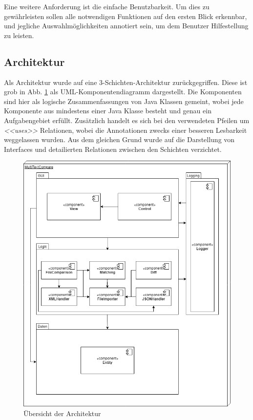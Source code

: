 Eine weitere Anforderung ist die einfache Benutzbarkeit. Um dies zu gewährleisten sollen alle notwendigen Funktionen auf den ersten Blick erkennbar, und jegliche Auswahlmöglichkeiten annotiert sein, um dem Benutzer Hilfestellung zu leisten.

\subsection{Architektur}\label{architektur}

Als Architektur wurde auf eine 3-Schichten-Architektur zurückgegriffen. Diese ist grob in Abb. \ref{fig:architektur} als UML-Komponentendiagramm dargestellt. Die Komponenten sind hier als logische Zusammenfassungen von Java Klassen gemeint, wobei jede Komponente aus mindestens einer Java Klasse besteht und genau ein Aufgabengebiet erfüllt. Zusätzlich handelt es sich bei den verwendeten Pfeilen um \textit{<<uses>>} Relationen, wobei die Annotationen zwecks einer besseren Lesbarkeit weggelassen wurden. Aus dem gleichen Grund wurde auf die Darstellung von Interfaces und detailierten Relationen zwischen den Schichten verzichtet.

\begin{figure}[!htb]
    \centering
    \includegraphics[scale=0.5]{images/Komponenten_MTC_final.png}
    \caption{Übersicht der Architektur}
    \label{fig:architektur}
\end{figure}

